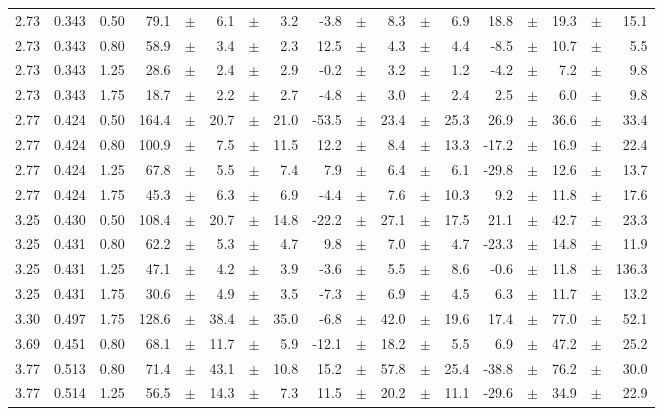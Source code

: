 \documentclass[prc,aps,floatfix,showpacs,showkeys,twocolumn,superscriptaddress,letterpaper,10pt]{revtex4-1}
\begin{document}
\begin{widetext}
\begin{longtable}{ccc@{\extracolsep{1cm}}d@{\extracolsep{0pt}}cdcd@{\extracolsep{1cm}}d@{\extracolsep{0pt}}cdcd@{\extracolsep{1cm}}d@{\extracolsep{0pt}}cdcd}
2.73 & 0.343 & 0.50 & 79.1 &	$\pm$ & 6.1 &	$\pm$ & 3.2 & -3.8 &	$\pm$ & 8.3 &	$\pm$ & 6.9 & 18.8 &	$\pm$ & 19.3 &	$\pm$ & 15.1\\
2.73 & 0.343 & 0.80 & 58.9 &	$\pm$ & 3.4 &	$\pm$ & 2.3 & 12.5 &	$\pm$ & 4.3 &	$\pm$ & 4.4 & -8.5 &	$\pm$ & 10.7 &	$\pm$ & 5.5\\
2.73 & 0.343 & 1.25 & 28.6 &	$\pm$ & 2.4 &	$\pm$ & 2.9 & -0.2 &	$\pm$ & 3.2 &	$\pm$ & 1.2 & -4.2 &	$\pm$ & 7.2 &	$\pm$ & 9.8\\
2.73 & 0.343 & 1.75 & 18.7 &	$\pm$ & 2.2 &	$\pm$ & 2.7 & -4.8 &	$\pm$ & 3.0 &	$\pm$ & 2.4 & 2.5 &	$\pm$ & 6.0 &	$\pm$ & 9.8\\
2.77 & 0.424 & 0.50 & 164.4 &	$\pm$ & 20.7 &	$\pm$ & 21.0 & -53.5 &	$\pm$ & 23.4 &	$\pm$ & 25.3 & 26.9 &	$\pm$ & 36.6 &	$\pm$ & 33.4\\
2.77 & 0.424 & 0.80 & 100.9 &	$\pm$ & 7.5 &	$\pm$ & 11.5 & 12.2 &	$\pm$ & 8.4 &	$\pm$ & 13.3 & -17.2 &	$\pm$ & 16.9 &	$\pm$ & 22.4\\
2.77 & 0.424 & 1.25 & 67.8 &	$\pm$ & 5.5 &	$\pm$ & 7.4 & 7.9 &	$\pm$ & 6.4 &	$\pm$ & 6.1 & -29.8 &	$\pm$ & 12.6 &	$\pm$ & 13.7\\
2.77 & 0.424 & 1.75 & 45.3 &	$\pm$ & 6.3 &	$\pm$ & 6.9 & -4.4 &	$\pm$ & 7.6 &	$\pm$ & 10.3 & 9.2 &	$\pm$ & 11.8 &	$\pm$ & 17.6\\
3.25 & 0.430 & 0.50 & 108.4 &	$\pm$ & 20.7 &	$\pm$ & 14.8 & -22.2 &	$\pm$ & 27.1 &	$\pm$ & 17.5 & 21.1 &	$\pm$ & 42.7 &	$\pm$ & 23.3\\
3.25 & 0.431 & 0.80 & 62.2 &	$\pm$ & 5.3 &	$\pm$ & 4.7 & 9.8 &	$\pm$ & 7.0 &	$\pm$ & 4.7 & -23.3 &	$\pm$ & 14.8 &	$\pm$ & 11.9\\
3.25 & 0.431 & 1.25 & 47.1 &	$\pm$ & 4.2 &	$\pm$ & 3.9 & -3.6 &	$\pm$ & 5.5 &	$\pm$ & 8.6 & -0.6 &	$\pm$ & 11.8 &	$\pm$ & 136.3\\
3.25 & 0.431 & 1.75 & 30.6 &	$\pm$ & 4.9 &	$\pm$ & 3.5 & -7.3 &	$\pm$ & 6.9 &	$\pm$ & 4.5 & 6.3 &	$\pm$ & 11.7 &	$\pm$ & 13.2\\
3.30 & 0.497 & 1.75 & 128.6 &	$\pm$ & 38.4 &	$\pm$ & 35.0 & -6.8 &	$\pm$ & 42.0 &	$\pm$ & 19.6 & 17.4 &	$\pm$ & 77.0 &	$\pm$ & 52.1\\
3.69 & 0.451 & 0.80 & 68.1 &	$\pm$ & 11.7 &	$\pm$ & 5.9 & -12.1 &	$\pm$ & 18.2 &	$\pm$ & 5.5 & 6.9 &	$\pm$ & 47.2 &	$\pm$ & 25.2\\
3.77 & 0.513 & 0.80 & 71.4 &	$\pm$ & 43.1 &	$\pm$ & 10.8 & 15.2 &	$\pm$ & 57.8 &	$\pm$ & 25.4 & -38.8 &	$\pm$ & 76.2 &	$\pm$ & 30.0\\
3.77 & 0.514 & 1.25 & 56.5 &	$\pm$ & 14.3 &	$\pm$ & 7.3 & 11.5 &	$\pm$ & 20.2 &	$\pm$ & 11.1 & -29.6 &	$\pm$ & 34.9 &	$\pm$ & 22.9\\

\end{longtable}
\end{widetext}
\end{document}
